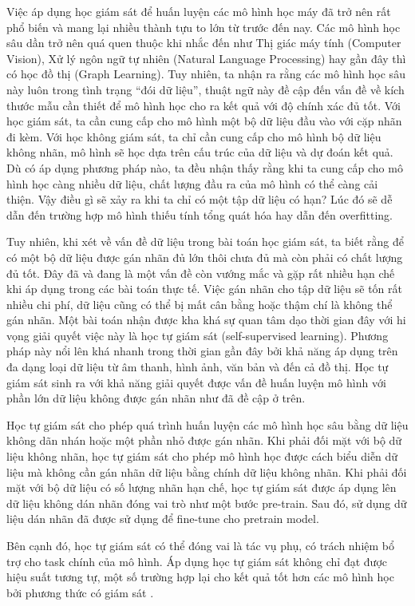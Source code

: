 \noindent Việc áp dụng học giám sát để huấn luyện các mô hình học máy đã trở nên rất phổ biến và mang lại nhiều thành tựu to lớn từ trước đến nay. Các mô hình học sâu dần trở nên quá quen thuộc khi nhắc đến như Thị giác máy tính (Computer Vision), Xử lý ngôn ngữ tự nhiên (Natural Language Processing) hay gần đây thì có học đồ thị (Graph Learning). Tuy nhiên, ta nhận ra rằng các mô hình học sâu này luôn trong tình trạng ``đói dữ liệu'', thuật ngữ này đề cập đến vấn đề về kích thước mẫu cần thiết để mô hình học cho ra kết quả với độ chính xác đủ tốt. Với học giám sát, ta cần cung cấp cho mô hình một bộ dữ liệu đầu vào với cặp nhãn đi kèm. Với học không giám sát, ta chỉ cần cung cấp cho mô hình bộ dữ liệu không nhãn, mô hình sẽ học dựa trên cấu trúc của dữ liệu và dự đoán kết quả. Dù có áp dụng phương pháp nào, ta đều nhận thấy rằng khi ta cung cấp cho mô hình học càng nhiều dữ liệu, chất lượng đầu ra của mô hình có thể càng cải thiện. Vậy điều gì sẽ xảy ra khi ta chỉ có một tập dữ liệu có hạn? Lúc đó sẽ dễ dẫn đến trường hợp mô hình thiếu tính tổng quát hóa hay dẫn đến overfitting.

Tuy nhiên, khi xét về vấn đề dữ liệu trong bài toán học giám sát, ta biết rằng để có một bộ dữ liệu được gán nhãn đủ lớn thôi chưa đủ mà còn phải có chất lượng đủ tốt. Đây đã và đang là một vấn đề  còn vướng mắc và gặp rất nhiều hạn chế khi áp dụng trong các bài toán thực tế. Việc gán nhãn cho tập dữ liệu sẽ tốn rất nhiều chi phí, dữ liệu cũng có thể bị mất cân bằng hoặc thậm chí là không thể gán nhãn. Một bài toán nhận được kha khá sự quan tâm dạo thời gian đây với hi vọng giải quyết việc này là học tự giám sát (self-supervised learning). Phương pháp này nổi lên khá nhanh trong thời gian gần đây bởi khả năng áp dụng trên đa dạng loại dữ liệu từ âm thanh, hình ảnh, văn bản và đến cả đồ thị. Học tự giám sát sinh ra với khả năng giải quyết được vấn đề huấn luyện mô hình với phần lớn dữ liệu không được gán nhãn như đã đề cập ở trên. 

Học tự giám sát cho phép quá trình huấn luyện các mô hình học sâu bằng dữ liệu không dãn nhán hoặc một phần nhỏ được gán nhãn. Khi phải đối mặt với bộ dữ liệu không nhãn, học tự giám sát cho phép mô hình học được cách biểu diễn dữ liệu mà không cần gán nhãn dữ liệu bằng chính dữ liệu không nhãn. Khi phải đối mặt với bộ dữ liệu có số lượng nhãn hạn chế, học tự giám sát được áp dụng lên dữ liệu không dán nhãn đóng vai trò như một bước pre-train. Sau đó, sử dụng dữ liệu dán nhãn đã được sử dụng để fine-tune cho pretrain model.

Bên cạnh đó, học tự giám sát có thể  đóng vai là tác vụ phụ, có trách nhiệm bổ trợ cho task chính của mô hình. Áp dụng học tự giám sát không chỉ đạt được hiệu suất tương tự, một số trường hợp lại cho kết quả tốt hơn các mô hình học bởi phương thức có giám sát \cite{review:ssl-of-GNN}.

